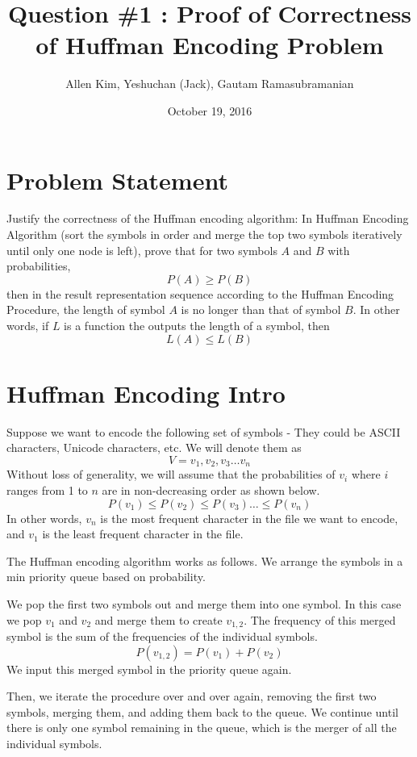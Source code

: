 \documentclass{article}
\title{Question \#1 : Proof of Correctness of Huffman Encoding Problem}
\author{Allen Kim, Yeshuchan (Jack), Gautam Ramasubramanian}
\date{October 19, 2016}
\begin{document}
\maketitle

\section*{Problem Statement}

Justify the correctness of the Huffman encoding algorithm: 
In Huffman Encoding Algorithm (sort the symbols in order and merge the top two symbols iteratively until only one node is left), 
prove that for two symbols $A$ and $B$ with probabilities,
$$
	P(A) \geq P(B)
$$ 
then in the result representation sequence according to the Huffman Encoding Procedure,
the length of symbol $A$ is no longer than that of symbol $B$. In other words, if $L$ is a function the outputs the length of a symbol, then
$$
	L(A) \leq L(B)
$$

\section*{Huffman Encoding Intro}

Suppose we want to encode the following set of symbols - They could be ASCII characters, Unicode characters, etc. We will denote them as
$$
V = {v_1, v_2, v_3 \ldots v_n}
$$
Without loss of generality, we will assume that the probabilities of $v_i$ where $i$ ranges from 1 to $n$ are in non-decreasing order as shown below.
$$
P(v_1) \leq P(v_2) \leq P(v_3) \ldots \leq P(v_n)
$$ 
In other words, $v_n$ is the most frequent character in the file we want to encode, and $v_1$ is the least frequent character in the file.

The Huffman encoding algorithm works as follows. We arrange the symbols in a min priority queue based on probability.

We pop the first two symbols out and merge them into one symbol. In this case we pop $v_1$ and $v_2$ and merge them to create $v_{1,2}$. The frequency of this merged symbol is the sum of the frequencies of the individual symbols.
$$
P(v_{1,2}) = P(v_1) + P(v_2)
$$
We input this merged symbol in the priority queue again.

Then, we iterate the procedure over and over again, removing the first two symbols, merging them, and adding them back to the queue. We continue until there is only one symbol remaining in the queue, which is the merger of all the individual symbols.
\end{document}
